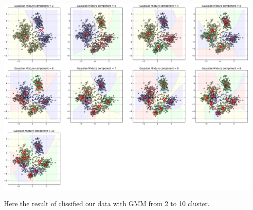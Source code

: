 \documentclass[11pt]{article}
\theoremstyle{plain}
\begin{document}
 \begin{center}
\includegraphics[scale=0.28]{3}
\end{center}
Here the result of clissified our data with GMM from 2 to 10 cluster.
 \\
\end{document}
